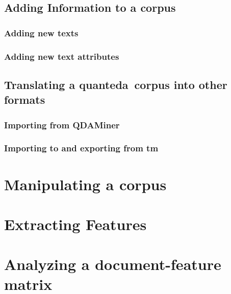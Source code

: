 \documentclass[11pt]{article}\usepackage[]{graphicx}\usepackage[]{color}
\newcommand{\quanteda}{\textsf{quanteda}\ }
\begin{document}
\subsection{Adding Information to a corpus}

\subsubsection{Adding new texts}

\subsubsection{Adding new text attributes}


\subsection{Translating a \quanteda corpus into other formats}

\subsubsection{Importing from QDAMiner}

\subsubsection{Importing to and exporting from \textsf{tm}}


\section{Manipulating a corpus}


\section{Extracting Features}


\section{Analyzing a document-feature matrix}







\end{document}
